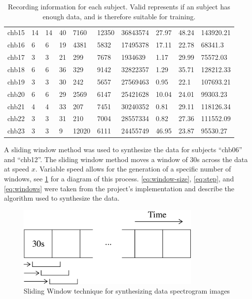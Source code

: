 \documentclass[12pt]{article}
\begin{document}
\begin{table}[H]
\begin{center}
\begin{tabular}{l|lll|lll|lll}
chb15 & 14        & 14      & 40        & 7160    & 12350   & 36843574    & 27.97     & 48.24     & 143920.21    \\
chb16 & 6         & 6       & 19        & 4381    & 5832    & 17495378    & 17.11     & 22.78     & 68341.3      \\
chb17 & 3         & 3       & 21        & 299     & 7678    & 1934639     & 1.17      & 29.99     & 75572.03     \\
chb18 & 6         & 6       & 36        & 329     & 9142    & 32822357    & 1.29      & 35.71     & 128212.33    \\
chb19 & 3         & 3       & 30        & 242     & 5657    & 27569463    & 0.95      & 22.1      & 107693.21    \\
chb20 & 6         & 6       & 29        & 2569    & 6147    & 25421628    & 10.04     & 24.01     & 99303.23     \\
chb21 & 4         & 4       & 33        & 207     & 7451    & 30240352    & 0.81      & 29.11     & 118126.34    \\
chb22 & 3         & 3       & 31        & 210     & 7004    & 28557334    & 0.82      & 27.36     & 111552.09    \\
chb23 & 3         & 3       & 9         & 12020   & 6111    & 24455749    & 46.95     & 23.87     & 95530.27    
\end{tabular}
\caption{Recording information for each subject. Valid represents if an subject has enough data, and is therefore suitable for training.}
\label{tab:class-size}
\end{center}
\end{table}


A sliding window method was used to synthesize the data for subjects ``chb06'' and ``chb12''. The sliding window method moves a window of 30s across the data at speed $x$. Variable speed allows for the generation of a specific number of windows, see \ref{fig:slidingWindow} for a diagram of this process. \ref{eq:window-size}, \ref{eq:step}, and \ref{eq:windows} were taken from the project's implementation and describe the algorithm used to synthesize the data.

\begin{figure}[H]
\includegraphics[width=0.8\textwidth]{slidingWindow}
\centering
\caption{Sliding Window technique for synthesizing data spectrogram images}
\label{fig:slidingWindow}
\end{figure}
\end{document}
